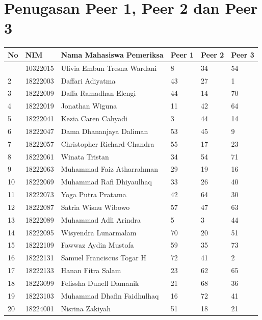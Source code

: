 \documentclass[
  letterpaper,
  DIV=11,
  numbers=noendperiod]{scrreprt}
\begin{document}
\section*{Penugasan Peer 1, Peer 2 dan Peer
3}\label{penugasan-peer-1-peer-2-dan-peer-3}


\begin{longtable}[]{@{}llllll@{}}
\toprule\noalign{}
No & NIM & Nama Mahasiswa Pemeriksa & Peer 1 & Peer 2 & Peer 3 \\
\midrule\noalign{}
\endhead
\bottomrule\noalign{}
\endlastfoot
1 & 10322015 & Ulivia Embun Tresna Wardani & 8 & 34 & 54 \\
2 & 18222003 & Daffari Adiyatma & 43 & 27 & 1 \\
3 & 18222009 & Daffa Ramadhan Elengi & 44 & 14 & 70 \\
4 & 18222019 & Jonathan Wiguna & 11 & 42 & 64 \\
5 & 18222041 & Kezia Caren Cahyadi & 3 & 44 & 14 \\
6 & 18222047 & Dama Dhananjaya Daliman & 53 & 45 & 9 \\
7 & 18222057 & Christopher Richard Chandra & 55 & 17 & 23 \\
8 & 18222061 & Winata Tristan & 34 & 54 & 71 \\
9 & 18222063 & Muhammad Faiz Atharrahman & 29 & 19 & 16 \\
10 & 18222069 & Muhammad Rafi Dhiyaulhaq & 33 & 26 & 40 \\
11 & 18222073 & Yoga Putra Pratama & 42 & 64 & 30 \\
12 & 18222087 & Satria Wisnu Wibowo & 57 & 47 & 63 \\
13 & 18222089 & Muhammad Adli Arindra & 5 & 3 & 44 \\
14 & 18222095 & Wisyendra Lunarmalam & 70 & 20 & 51 \\
15 & 18222109 & Fawwaz Aydin Mustofa & 59 & 35 & 73 \\
16 & 18222131 & Samuel Franciscus Togar H & 72 & 41 & 2 \\
17 & 18222133 & Hanan Fitra Salam & 23 & 62 & 65 \\
18 & 18223099 & Felissha Dunell Damanik & 21 & 68 & 36 \\
19 & 18223103 & Muhammad Dhafin Faidhulhaq & 16 & 72 & 41 \\
20 & 18224001 & Nisrina Zakiyah & 51 & 18 & 21 \\

\end{longtable}
\end{document}
